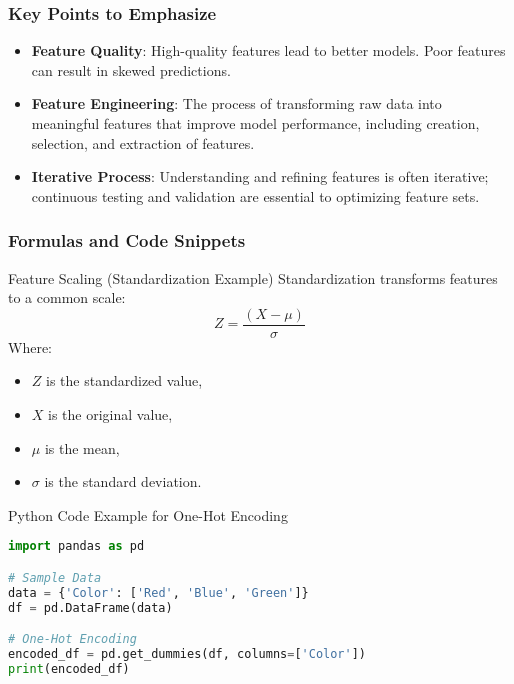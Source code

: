 \documentclass[aspectratio=169]{beamer}
\begin{document}
\begin{frame}[fragile]
    \frametitle{Key Points to Emphasize}
    \begin{itemize}
        \item \textbf{Feature Quality}: High-quality features lead to better models. Poor features can result in skewed predictions.
        
        \item \textbf{Feature Engineering}: The process of transforming raw data into meaningful features that improve model performance, including creation, selection, and extraction of features.
        
        \item \textbf{Iterative Process}: Understanding and refining features is often iterative; continuous testing and validation are essential to optimizing feature sets.
    \end{itemize}
\end{frame}

\begin{frame}[fragile]
    \frametitle{Formulas and Code Snippets}
    \begin{block}{Feature Scaling (Standardization Example)}
        Standardization transforms features to a common scale:
        \begin{equation}
            Z = \frac{(X - \mu)}{\sigma}
        \end{equation}
        Where:
        \begin{itemize}
            \item \( Z \) is the standardized value,
            \item \( X \) is the original value,
            \item \( \mu \) is the mean,
            \item \( \sigma \) is the standard deviation.
        \end{itemize}
    \end{block}
    
    \begin{block}{Python Code Example for One-Hot Encoding}
        \begin{lstlisting}[language=Python]
import pandas as pd

# Sample Data
data = {'Color': ['Red', 'Blue', 'Green']}
df = pd.DataFrame(data)

# One-Hot Encoding
encoded_df = pd.get_dummies(df, columns=['Color'])
print(encoded_df)
        \end{lstlisting}
    \end{block}
\end{frame}
\end{document}
